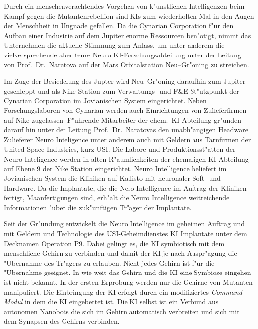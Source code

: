 

Durch ein menschenverachtendes Vorgehen von k"unstlichen Intelligenzen beim Kampf gegen die Mutantenrebellion sind KIs zum wiederholten Mal in den Augen der Menschheit in Ungnade gefallen. Da die Cynarian Corporation f"ur den Aufbau einer Industrie auf dem Jupiter enorme Ressourcen ben"otigt, nimmt das Unternehmen die aktuelle Stimmung zum Anlass, um unter anderem die vielversprechende aber teure Neuro KI-Forschungsabteilung unter der Leitung von Prof.~Dr.~Naratova auf der Mars Orbitalstation Neu--Gr"oning zu streichen.

Im Zuge der Besiedelung des Jupter wird Neu--Gr"oning daraufhin zum Jupiter geschleppt und als Nike Station zum Verwaltungs- und F\&E St"utzpunkt der Cynarian Corporation im Jovianischen System eingerichtet. Neben Forschungslaboren von Cynarian werden auch Einrichtungen von Zulieferfirmen auf Nike zugelassen. F"uhrende Mitarbeiter der ehem.~KI-Abteilung gr"unden darauf hin unter der Leitung Prof.~Dr.~Naratovas den unabh"angigen Headware Zulieferer Neuro Inteligence unter anderem auch mit Geldern aus Tarnfirmen der United Space Industries, kurz USI. Die Labore und Produktionsst"atten der Neuro Inteligence werden in alten R"aumlichkeiten der ehemaligen KI-Abteilung auf Ebene 9 der Nike Station eingerichtet. Neuro Intelligence beliefert im Jovianischen System die Kliniken auf Kallisto mit neuronaler Soft- und Hardware. Da die Implantate, die die Nero Intelligence im Auftrag der Kliniken fertigt, Ma\3anfertigungen sind, erh"alt die Neuro Intelligence weitreichende Informationen "uber die zuk"unftigen Tr"ager der Implantate.

Seit der Gr"undung entwickelt die Neuro Intelligence im geheimen Auftrag und mit Geldern und Technologie des USI-Geheimdienstes KI Implantate unter dem Decknamen Operation P9. Dabei gelingt es, die KI symbiotisch mit dem menschliche Gehirn zu verbinden und damit der KI je nach Auspr"agung die "Ubernahme des Tr"agers zu erlauben. Nicht jedes Gehirn ist f"ur die "Ubernahme geeignet. In wie weit das Gehirn und die KI eine Symbiose eingehen ist nicht bekannt. In der ersten Erprobung werden nur die Gehirne von Mutanten manipuliert. Die Einbringung der KI erfolgt durch ein modifiziertes \emph{Command Modul} in dem die KI eingebettet ist. Die KI selbst ist ein Verbund aus autonomen Nanobots die sich im Gehirn automatisch verbreiten und sich mit dem Synapsen des Gehirns verbinden.

